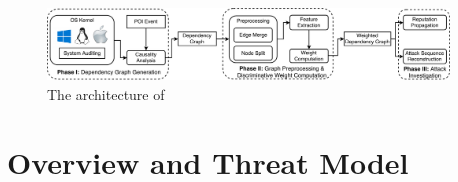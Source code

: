 \begin{figure}[!ht]
    \centering
    \includegraphics[width=0.95\textwidth,clip]{figs/architecture.pdf}
    \caption{The architecture of \tool}
    \label{fig:overview}
\end{figure}


\section{Overview and Threat Model}
\label{sec:overview}

